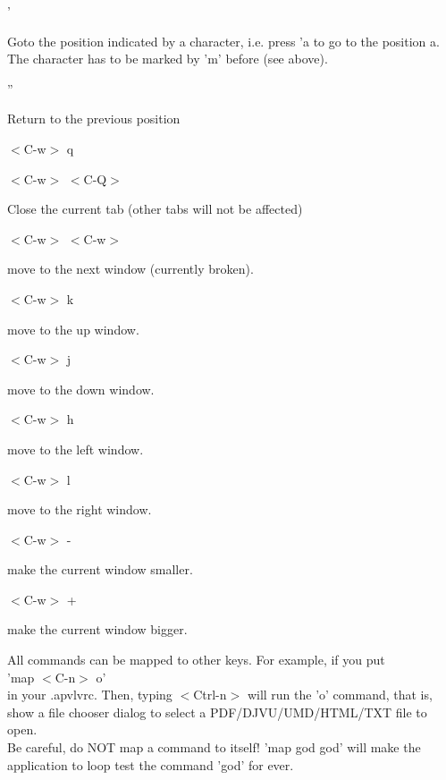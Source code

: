 \documentclass[a4paper,12pt]{article}
\begin{document}
\begin{description}
\item '

Goto the position indicated by a character, i.e. press 'a to go to the position a. \\
The character has to be marked by 'm' before (see above).

\item ''

Return to the previous position

\item $<$C-w$>$ q
\item $<$C-w$>$ $<$C-Q$>$

Close the current tab (other tabs will not be affected)

\item $<$C-w$>$ $<$C-w$>$

move to the next window (currently broken).

\item $<$C-w$>$ k

move to the up window.

\item $<$C-w$>$ j

move to the down window.

\item $<$C-w$>$ h

move to the left window.

\item $<$C-w$>$ l

move to the right window.

\item $<$C-w$>$ -

make the current window smaller.

\item $<$C-w$>$ +

make the current window bigger.

\end{description}

\noindent All commands can be mapped to other keys. For example, if you put \\
'map $<$C-n$>$ o'\\
in your .apvlvrc. Then, typing $<$Ctrl-n$>$ will run the 'o' command, that is, show a file chooser dialog to select a PDF/DJVU/UMD/HTML/TXT file to open.\\
\noindent Be careful, do NOT map a command to itself! 'map god god' will make the application to loop test the command 'god' for ever.
\end{document}
